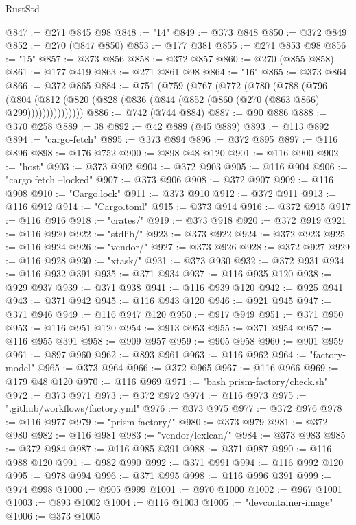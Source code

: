 \begin{lexlean}{RustStd}
\begin{coremodule}
@847 := @271 @845 @98
@848 := "14"
@849 := @373 @848
@850 := @372 @849
@852 := @270 (@847 @850)
@853 := @177 @381
@855 := @271 @853 @98
@856 := "15"
@857 := @373 @856
@858 := @372 @857
@860 := @270 (@855 @858)
@861 := @177 @419
@863 := @271 @861 @98
@864 := "16"
@865 := @373 @864
@866 := @372 @865
@884 := @751
    (@759
      (@767
        (@772
          (@780
            (@788
              (@796
                (@804
                  (@812 (@820 (@828 (@836 (@844 (@852 (@860 (@270 (@863 @866) @299)))))))))))))))
@886 := @742 (@744 @884)
@887 := @90 @886
@888 := @370 @258
@889 := 38
@892 := @42 @889 (@45 @889)
@893 := @113 @892
@894 := "cargo-fetch"
@895 := @373 @894
@896 := @372 @895
@897 := @116 @896
@898 := @176 @752
@900 := @898 @48 @120
@901 := @116 @900
@902 := "host"
@903 := @373 @902
@904 := @372 @903
@905 := @116 @904
@906 := "cargo fetch --locked"
@907 := @373 @906
@908 := @372 @907
@909 := @116 @908
@910 := "Cargo.lock"
@911 := @373 @910
@912 := @372 @911
@913 := @116 @912
@914 := "Cargo.toml"
@915 := @373 @914
@916 := @372 @915
@917 := @116 @916
@918 := "crates/"
@919 := @373 @918
@920 := @372 @919
@921 := @116 @920
@922 := "stdlib/"
@923 := @373 @922
@924 := @372 @923
@925 := @116 @924
@926 := "vendor/"
@927 := @373 @926
@928 := @372 @927
@929 := @116 @928
@930 := "xtask/"
@931 := @373 @930
@932 := @372 @931
@934 := @116 @932 @391
@935 := @371 @934
@937 := @116 @935 @120
@938 := @929 @937
@939 := @371 @938
@941 := @116 @939 @120
@942 := @925 @941
@943 := @371 @942
@945 := @116 @943 @120
@946 := @921 @945
@947 := @371 @946
@949 := @116 @947 @120
@950 := @917 @949
@951 := @371 @950
@953 := @116 @951 @120
@954 := @913 @953
@955 := @371 @954
@957 := @116 @955 @391
@958 := @909 @957
@959 := @905 @958
@960 := @901 @959
@961 := @897 @960
@962 := @893 @961
@963 := @116 @962
@964 := "factory-model"
@965 := @373 @964
@966 := @372 @965
@967 := @116 @966
@969 := @179 @48 @120
@970 := @116 @969
@971 := "bash prism-factory/check.sh"
@972 := @373 @971
@973 := @372 @972
@974 := @116 @973
@975 := ".github/workflows/factory.yml"
@976 := @373 @975
@977 := @372 @976
@978 := @116 @977
@979 := "prism-factory/"
@980 := @373 @979
@981 := @372 @980
@982 := @116 @981
@983 := "vendor/lexlean/"
@984 := @373 @983
@985 := @372 @984
@987 := @116 @985 @391
@988 := @371 @987
@990 := @116 @988 @120
@991 := @982 @990
@992 := @371 @991
@994 := @116 @992 @120
@995 := @978 @994
@996 := @371 @995
@998 := @116 @996 @391
@999 := @974 @998
@1000 := @905 @999
@1001 := @970 @1000
@1002 := @967 @1001
@1003 := @893 @1002
@1004 := @116 @1003
@1005 := "devcontainer-image"
@1006 := @373 @1005

\end{coremodule}
\end{lexlean}
